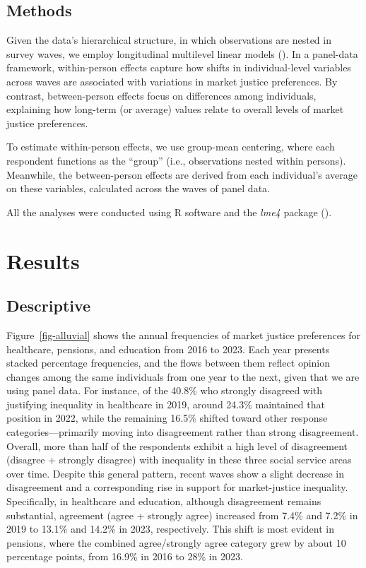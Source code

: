 \documentclass[
  12pt,
]{article}
\begin{document}
\subsection{Methods}\label{methods}

Given the data's hierarchical structure, in which observations are
nested in survey waves, we employ longitudinal multilevel linear models
(). In a
panel-data framework, within-person effects capture how shifts in
individual-level variables across waves are associated with variations
in market justice preferences. By contrast, between-person effects focus
on differences among individuals, explaining how long-term (or average)
values relate to overall levels of market justice preferences.

To estimate within-person effects, we use group-mean centering, where
each respondent functions as the ``group'' (i.e., observations nested
within persons). Meanwhile, the between-person effects are derived from
each individual's average on these variables, calculated across the
waves of panel data.

All the analyses were conducted using R software and the \emph{lme4}
package ().

\section{Results}\label{results}

\subsection{Descriptive}\label{descriptive}

Figure~\ref{fig-alluvial} shows the annual frequencies of market justice
preferences for healthcare, pensions, and education from 2016 to 2023.
Each year presents stacked percentage frequencies, and the flows between
them reflect opinion changes among the same individuals from one year to
the next, given that we are using panel data. For instance, of the
40.8\% who strongly disagreed with justifying inequality in healthcare
in 2019, around 24.3\% maintained that position in 2022, while the
remaining 16.5\% shifted toward other response categories---primarily
moving into disagreement rather than strong disagreement. Overall, more
than half of the respondents exhibit a high level of disagreement
(disagree + strongly disagree) with inequality in these three social
service areas over time. Despite this general pattern, recent waves show
a slight decrease in disagreement and a corresponding rise in support
for market-justice inequality. Specifically, in healthcare and
education, although disagreement remains substantial, agreement (agree +
strongly agree) increased from 7.4\% and 7.2\% in 2019 to 13.1\% and
14.2\% in 2023, respectively. This shift is most evident in pensions,
where the combined agree/strongly agree category grew by about 10
percentage points, from 16.9\% in 2016 to 28\% in 2023.
\end{document}
